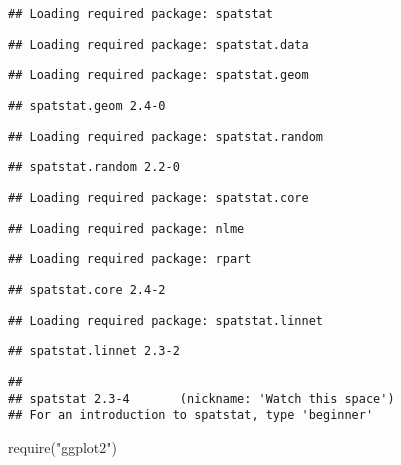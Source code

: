 \documentclass[
]{book}
\newenvironment{Shaded}{\begin{snugshade}}{\end{snugshade}}
\newcommand{\FunctionTok}[1]{\textcolor[rgb]{0.00,0.00,0.00}{#1}}
\newcommand{\NormalTok}[1]{#1}
\newcommand{\StringTok}[1]{\textcolor[rgb]{0.31,0.60,0.02}{#1}}
\begin{document}
\begin{verbatim}
## Loading required package: spatstat
\end{verbatim}

\begin{verbatim}
## Loading required package: spatstat.data
\end{verbatim}

\begin{verbatim}
## Loading required package: spatstat.geom
\end{verbatim}

\begin{verbatim}
## spatstat.geom 2.4-0
\end{verbatim}

\begin{verbatim}
## Loading required package: spatstat.random
\end{verbatim}

\begin{verbatim}
## spatstat.random 2.2-0
\end{verbatim}

\begin{verbatim}
## Loading required package: spatstat.core
\end{verbatim}

\begin{verbatim}
## Loading required package: nlme
\end{verbatim}

\begin{verbatim}
## Loading required package: rpart
\end{verbatim}

\begin{verbatim}
## spatstat.core 2.4-2
\end{verbatim}

\begin{verbatim}
## Loading required package: spatstat.linnet
\end{verbatim}

\begin{verbatim}
## spatstat.linnet 2.3-2
\end{verbatim}

\begin{verbatim}
## 
## spatstat 2.3-4       (nickname: 'Watch this space') 
## For an introduction to spatstat, type 'beginner'
\end{verbatim}

\begin{Shaded}
\begin{Highlighting}[]
\FunctionTok{require}\NormalTok{(}\StringTok{"ggplot2"}\NormalTok{)}
\end{Highlighting}
\end{Shaded}
\end{document}
